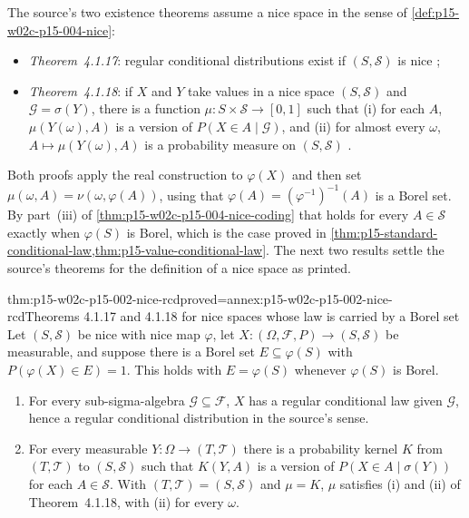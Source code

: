The source's two existence theorems assume a nice space in the sense of
\cref{def:p15-w02c-p15-004-nice}:
\begin{itemize}
\item \emph{Theorem~4.1.17}: regular conditional distributions exist if
      \((S,\mathcal S)\) is nice \cite[p.~215]{DurrettPTEAuthor2019};
\item \emph{Theorem~4.1.18}: if \(X\) and \(Y\) take values in a nice space
      \((S,\mathcal S)\) and \(\mathcal G=\sigma(Y)\), there is a function
      \(\mu:S\times\mathcal S\to[0,1]\) such that (i) for each \(A\),
      \(\mu(Y(\omega),A)\) is a version of \(P(X\in A\mid\mathcal G)\), and
      (ii) for almost every \(\omega\), \(A\mapsto\mu(Y(\omega),A)\) is a
      probability measure on \((S,\mathcal S)\)
      \cite[p.~215]{DurrettPTEAuthor2019}.
\end{itemize}
Both proofs apply the real construction to \(\varphi(X)\) and then set
\(\mu(\omega,A)=\nu(\omega,\varphi(A))\), using that
\(\varphi(A)=(\varphi^{-1})^{-1}(A)\) is a Borel set. By part~(iii) of
\cref{thm:p15-w02c-p15-004-nice-coding} that holds for every
\(A\in\mathcal S\) exactly when \(\varphi(S)\) is Borel, which is the case
proved in \cref{thm:p15-standard-conditional-law,thm:p15-value-conditional-law}.
The next two results settle the source's theorems for the definition of a
nice space as printed.

\begin{hbtheorem}{thm:p15-w02c-p15-002-nice-rcd}{proved=annex:p15-w02c-p15-002-nice-rcd}{Theorems 4.1.17 and 4.1.18 for nice spaces whose law is carried by a Borel set}
Let \((S,\mathcal S)\) be nice with nice map \(\varphi\), let
\(X:(\Omega,\mathcal F,P)\to(S,\mathcal S)\) be measurable, and suppose
there is a Borel set \(E\subseteq\varphi(S)\) with
\(P(\varphi(X)\in E)=1\). This holds with \(E=\varphi(S)\) whenever
\(\varphi(S)\) is Borel.
\begin{enumerate}
\item For every sub-sigma-algebra \(\mathcal G\subseteq\mathcal F\), \(X\)
      has a regular conditional law given \(\mathcal G\), hence a regular
      conditional distribution in the source's sense.
\item For every measurable \(Y:\Omega\to(T,\mathcal T)\) there is a
      probability kernel \(K\) from \((T,\mathcal T)\) to
      \((S,\mathcal S)\) such that \(K(Y,A)\) is a version of
      \(P(X\in A\mid\sigma(Y))\) for each \(A\in\mathcal S\). With
      \((T,\mathcal T)=(S,\mathcal S)\) and \(\mu=K\), \(\mu\) satisfies
      (i) and (ii) of Theorem~4.1.18, with (ii) for every \(\omega\).
\end{enumerate}
\end{hbtheorem}

